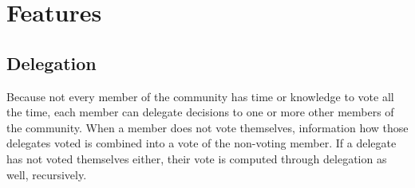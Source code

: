 \documentclass{sigchi}
\begin{document}
%
%
%
%
%

\section{Features}

\subsection{Delegation}
Because not every member of the community has time or knowledge to vote all the time, each member can delegate
decisions to one or more other members of the community.
When a member does not vote themselves, information how those delegates voted is combined into a vote of
the non-voting member.
If a delegate has not voted themselves either, their vote is computed through delegation as well, recursively.
\end{document}
